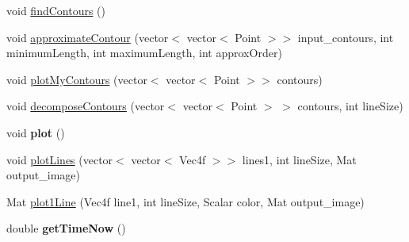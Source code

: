 \begin{DoxyCompactItemize}
\item 
void \hyperlink{classContoursAndLines_a0b5dd7edb7059cc7aa5a4296ffb4317c}{findContours} ()
\item 
void \hyperlink{classContoursAndLines_af2ae9375067d26c49dcd7fa52c85444a}{approximateContour} (vector$<$ vector$<$ Point $>$$>$ input\_\-contours, int minimumLength, int maximumLength, int approxOrder)
\item 
void \hyperlink{classContoursAndLines_aea09b8c601e2b9e24128fc506e4438dd}{plotMyContours} (vector$<$ vector$<$ Point $>$$>$ contours)
\item 
void \hyperlink{classContoursAndLines_a02a092093a9f66feb5714fede7b1be16}{decomposeContours} (vector$<$ vector$<$ Point $>$ $>$ contours, int lineSize)
\item 
\hypertarget{classContoursAndLines_ab3ec222236570871745f3176a6990e1e}{
void {\bfseries plot} ()}
\label{classContoursAndLines_ab3ec222236570871745f3176a6990e1e}

\item 
void \hyperlink{classContoursAndLines_a8cec007cc0061798867936ebb400687a}{plotLines} (vector$<$ vector$<$ Vec4f $>$$>$ lines1, int lineSize, Mat output\_\-image)
\item 
Mat \hyperlink{classContoursAndLines_abb87059453ad6a0eaf22e98100606870}{plot1Line} (Vec4f line1, int lineSize, Scalar color, Mat output\_\-image)
\item 
\hypertarget{classContoursAndLines_a5c4d7f68d18a2fba46b1cfe6f10338eb}{
double {\bfseries getTimeNow} ()}
\label{classContoursAndLines_a5c4d7f68d18a2fba46b1cfe6f10338eb}

\end{DoxyCompactItemize}
